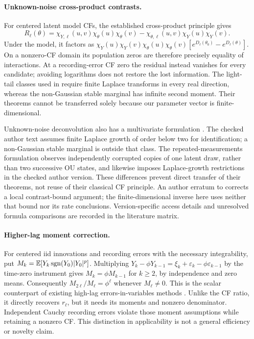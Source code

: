\documentclass[11pt,a4paper]{article}
\theoremstyle{remark}\newtheorem{remark}[theorem]{Remark}
\newcommand{\E}{\mathbb E}\newcommand{\Pp}{\mathbb P}
\begin{document}
\paragraph{Unknown-noise cross-product contrasts.}
For centered latent model CFs, the established cross-product principle \cite{gl} gives
\[
R_\ell(\theta)=\chi_{Y,\ell}(u,v)\chi_\theta(u)\chi_\theta(v)
-\chi_{\theta,\ell}(u,v)\chi_Y(u)\chi_Y(v).
\]
Under the model, it factors as
$\chi_Y(u)\chi_Y(v)\chi_\theta(u)\chi_\theta(v)
[e^{D_\ell(\theta_0)}-e^{D_\ell(\theta)}]$.
On a nonzero-CF domain its population zeros are therefore precisely equality of interactions. At a recording-error CF zero the residual instead vanishes for every candidate; avoiding logarithms does not restore the lost information. The light-tail classes used in \cite{gl} require finite Laplace transforms in every real direction, whereas the non-Gaussian stable marginal has infinite second moment. Their theorems cannot be transferred solely because our parameter vector is finite-dimensional.

Unknown-noise deconvolution also has a multivariate formulation \cite{gl22}. The checked author text assumes finite Laplace growth of order below two for identification; a non-Gaussian stable marginal is outside that class. The repeated-measurements formulation \cite{repeat} observes independently corrupted copies of one latent draw, rather than two successive OU states, and likewise imposes Laplace-growth restrictions in the checked author version. These differences prevent direct transfer of their theorems, not reuse of their classical CF principle. An author erratum to \cite{gl22} corrects a local contrast-bound argument; the finite-dimensional inverse here uses neither that bound nor its rate conclusions. Version-specific access details and unresolved formula comparisons are recorded in the literature matrix.

\paragraph{Higher-lag moment correction.}
For centered iid innovations and recording errors with the necessary integrability, put
$M_k=\E[Y_k\sgn(Y_0)|Y_0|^p]$. Multiplying
$Y_k-\phi Y_{k-1}=\xi_k+\varepsilon_k-\phi\varepsilon_{k-1}$
by the time-zero instrument gives $M_k=\phi M_{k-1}$ for $k\ge2$, by independence and zero means. Consequently $M_{2\ell}/M_\ell=\phi^\ell$ whenever $M_\ell\ne0$. This is the scalar counterpart of existing high-lag errors-in-variables methods \cite{zw}. Unlike the CF ratio, it directly recovers $r_\ell$, but it needs its moments and nonzero denominator. Independent Cauchy recording errors violate those moment assumptions while retaining a nonzero CF. This distinction in applicability is not a general efficiency or novelty claim.
\end{document}
